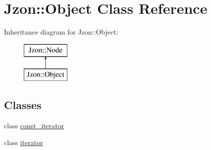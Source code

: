 \hypertarget{class_jzon_1_1_object}{\section{Jzon\-:\-:Object Class Reference}
\label{class_jzon_1_1_object}
}
Inheritance diagram for Jzon\-:\-:Object\-:\begin{figure}[H]
\begin{center}
\leavevmode
\includegraphics[height=2.000000cm]{class_jzon_1_1_object}
\end{center}
\end{figure}
\subsection*{Classes}
\begin{DoxyCompactItemize}
\item 
class \hyperlink{class_jzon_1_1_object_1_1const__iterator}{const\-\_\-iterator}
\item 
class \hyperlink{class_jzon_1_1_object_1_1iterator}{iterator}
\end{DoxyCompactItemize}
